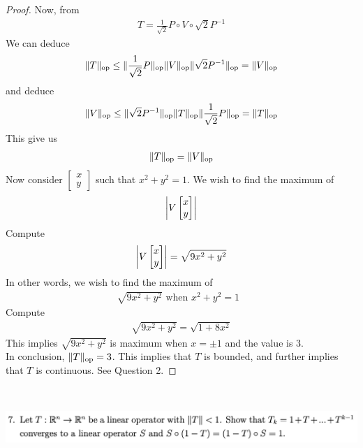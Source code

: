 \documentclass{report}
\begin{document}
\begin{proof}
Now, from 
\begin{align*}
T=\frac{1}{\sqrt{2}}P\circ V\circ \sqrt{2}P^{-1} 
\end{align*}
We can deduce
\begin{align*}
\| T \|_{\text{op}}\leq \| \frac{1}{\sqrt{2} }P \|_{\text{op}}\| V \|_{\text{op}}\| \sqrt{2}P^{-1} \|_{\text{op}}= \| V \|_{\text{op}}
\end{align*}
and deduce 
\begin{align*}
\| V \|_\text{op}\leq \| \sqrt{2}P^{-1} \|_\text{op}\| T \|_\text{op}\| \frac{1}{\sqrt{2} }P \|_\text{op}= \| T \|_{\text{op}}
\end{align*}
This give us 
\begin{align*}
\| T \|_{\text{op}}=\| V \|_{\text{op}}
\end{align*}
Now consider $\begin{bmatrix}
x\\
y
\end{bmatrix}$ such that $x^2+y^2=1$. We wish to find the maximum of 
 \begin{align*}
\left|V\begin{bmatrix}
x\\
y
\end{bmatrix}\right|
\end{align*}
Compute 
\begin{align*}
\left|V\begin{bmatrix}
x\\
y
\end{bmatrix}\right|=\sqrt{9x^2+y^2} 
\end{align*}
In other words, we wish to find the maximum of 
\begin{align*}
\sqrt{9x^2+y^2} \text{ when $x^2+y^2=1$ }
\end{align*}
Compute 
\begin{align*}
\sqrt{9x^2+y^2}=\sqrt{1+8x^2} 
\end{align*}
This implies $\sqrt{9x^2+y^2}$ is maximum when $x=\pm 1$ and the value is  $3$.\\

In conclusion,  $\| T \|_\text{op}=3$. This implies that $T$ is bounded, and further implies that  $T$ is continuous. See Question 2. 
\end{proof}
\begin{question}{}{}
\includegraphics[height=3cm,width=18cm]{ahw4q7}
\end{question}
\end{document}

